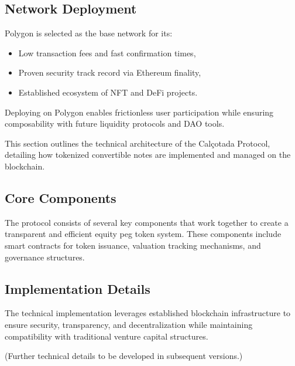 \documentclass[conference]{IEEEtran}
\begin{document}
\subsection{Network Deployment}

Polygon is selected as the base network for its:
\begin{itemize}
    \item Low transaction fees and fast confirmation times,
    \item Proven security track record via Ethereum finality,
    \item Established ecosystem of NFT and DeFi projects.
\end{itemize}

Deploying on Polygon enables frictionless user participation while ensuring composability with future liquidity protocols and DAO tools.



This section outlines the technical architecture of the Calçotada Protocol, detailing how tokenized convertible notes are implemented and managed on the blockchain.

\subsection{Core Components}

The protocol consists of several key components that work together to create a transparent and efficient equity peg token system. These components include smart contracts for token issuance, valuation tracking mechanisms, and governance structures.

\subsection{Implementation Details}

The technical implementation leverages established blockchain infrastructure to ensure security, transparency, and decentralization while maintaining compatibility with traditional venture capital structures.

(Further technical details to be developed in subsequent versions.)



\end{document}
